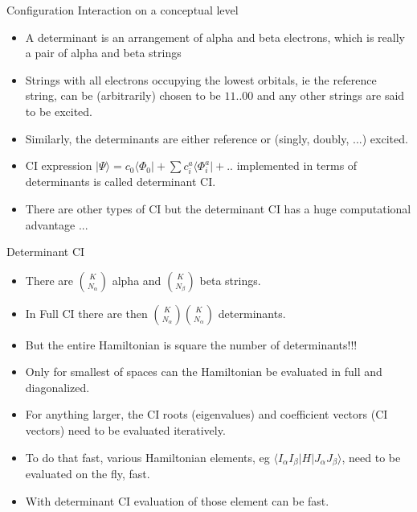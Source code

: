\documentclass{beamer}
\newcommand{\bra}[1]{\langle #1|}
\newcommand{\ket}[1]{|#1\rangle}
\begin{document}
\begin{frame}{Configuration Interaction on a conceptual level}
\begin{itemize}
\item A determinant is an arrangement of alpha and beta electrons,
  which is really a pair of alpha and beta strings
\item Strings with all electrons occupying the lowest orbitals, ie the reference string,
  can be (arbitrarily) chosen to be $11..00$ and any other strings are said to be excited.
\item Similarly, the determinants are either reference or (singly, doubly, ...) excited.
\item CI expression $\ket{\Psi} = c_0 \bra{\Phi_0} + \sum{c_i^a \bra{\Phi_i^a} } +  ..$
 implemented in terms of determinants is called determinant CI.
\item There are other types of CI but the determinant CI has a huge computational advantage ...
\end{itemize}
\end{frame}

\begin{frame}{Determinant CI}
\begin{itemize}
\item There are ${K \choose N_\alpha}$ alpha and ${K \choose N_\beta}$ beta strings.
\item In Full CI there are then ${K \choose N_\alpha} {K \choose N_\alpha}$ determinants.
\item But the entire Hamiltonian is square the number of determinants!!!
\item Only for smallest of spaces can the Hamiltonian be evaluated in full and diagonalized.
\item For anything larger, the CI roots (eigenvalues) and coefficient vectors (CI vectors)
  need to be evaluated iteratively.
\item To do that fast, various Hamiltonian elements, eg
  $\bra{I_\alpha I_\beta} H \ket{J_\alpha J_\beta}$,
  need to be evaluated on the fly, fast. 
\item With determinant CI evaluation of those element can be fast.
\end{itemize}
\end{frame}
\end{document}

